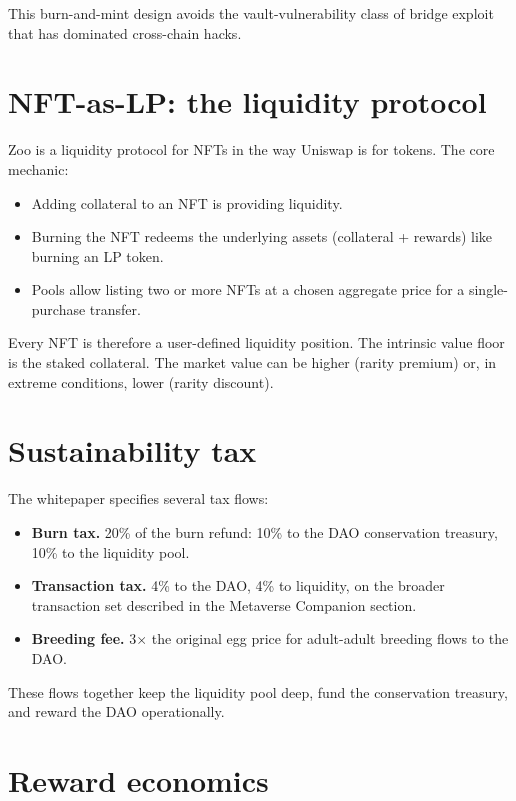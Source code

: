 \documentclass[11pt,letterpaper]{article}
\begin{document}
This burn-and-mint design avoids the vault-vulnerability class of bridge exploit that has dominated cross-chain hacks.

\section{NFT-as-LP: the liquidity protocol}

Zoo is a liquidity protocol for NFTs in the way Uniswap is for tokens. The core mechanic:

\begin{itemize}
  \item Adding collateral to an NFT is providing liquidity.
  \item Burning the NFT redeems the underlying assets (collateral + rewards) like burning an LP token.
  \item Pools allow listing two or more NFTs at a chosen aggregate price for a single-purchase transfer.
\end{itemize}

Every NFT is therefore a user-defined liquidity position. The intrinsic value floor is the staked collateral. The market value can be higher (rarity premium) or, in extreme conditions, lower (rarity discount).

\section{Sustainability tax}

The whitepaper specifies several tax flows:

\begin{itemize}
  \item \textbf{Burn tax.} 20\% of the burn refund: 10\% to the DAO conservation treasury, 10\% to the liquidity pool.
  \item \textbf{Transaction tax.} 4\% to the DAO, 4\% to liquidity, on the broader transaction set described in the Metaverse Companion section.
  \item \textbf{Breeding fee.} 3$\times$ the original egg price for adult-adult breeding flows to the DAO.
\end{itemize}

These flows together keep the liquidity pool deep, fund the conservation treasury, and reward the DAO operationally.

\section{Reward economics}
\end{document}
